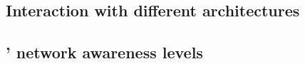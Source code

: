 

\subsection{Interaction with different architectures}


\subsection{\texorpdfstring{'}{RMs'} network awareness levels}

